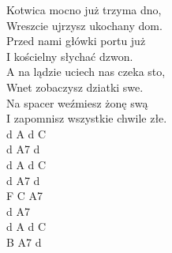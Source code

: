 {Kotwica mocno już trzyma dno, \\
Wreszcie ujrzysz ukochany dom. \\
Przed nami główki portu już \\
I kościelny słychać dzwon. \\
A na lądzie uciech nas czeka sto, \\
Wnet zobaczysz dziatki swe. \\
Na spacer weźmiesz żonę swą \\
I zapomnisz wszystkie chwile złe. \\

}{
d A d C \\
d A7 d \\
d A d C \\
d A7 d \\
F C A7 \\
d A7 \\
d A d C \\
B A7 d \\

}